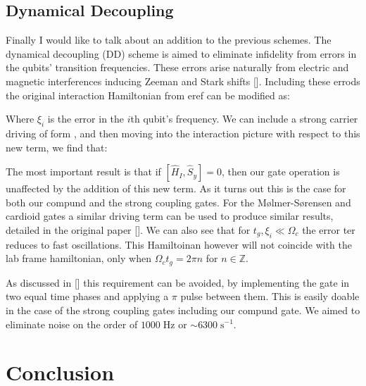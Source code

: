 \documentclass[12pt,twoside]{report}
\begin{document}
\section{Dynamical Decoupling}
\label{Driving_schemes:DD}

Finally I would like to talk about an addition to the previous schemes. The dynamical decoupling (DD) scheme is aimed to eliminate infidelity from errors in the qubits' transition frequencies. These errors arise naturally from electric and magnetic interferences inducing Zeeman and Stark shifts []. Including these errods the original interaction Hamiltonian from eref can be modified as:

Where $\xi_i$ is the error in the $i$th qubit's frequency.  We can include a strong carrier driving of form $ $, and then moving into the interaction picture with respect to this new term, we find that:

The most important result is that if $[\hat{H}_I,\hat{S}_y]=0$, then our gate operation is unaffected by the addition of this new term. As it turns out this is the case for both our compund and the strong coupling gates. For the M\o lmer-S\o rensen and cardioid gates a similar driving term can be used to produce similar results, detailed in the original paper []. We can also see that for $t_g, \xi_i \ll \Omega_c$ the error ter reduces to fast oscillations. This Hamiltoinan however will not coincide with the lab frame hamiltonian, only when $\Omega_c t_g = 2\pi n$ for $n \in \mathbb{Z}$.

As discussed in [] this requirement can be avoided, by implementing the gate in two equal time phases and applying a $\pi$ pulse between them. This is easily doable in the case of the strong coupling gates including our compund gate.
We aimed to eliminate noise on the order of $1000\;\text{Hz}$ or $\sim 6300\;\text{s}^{-1}$.

\chapter{Conclusion}
\label{Conclusion}



\end{document}
